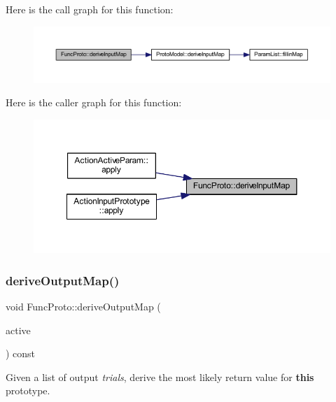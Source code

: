 Here is the call graph for this function\+:
\nopagebreak
\begin{figure}[H]
\begin{center}
\leavevmode
\includegraphics[width=350pt]{class_func_proto_a06ef0c088573715372df24ef978bd610_cgraph}
\end{center}
\end{figure}
Here is the caller graph for this function\+:
\nopagebreak
\begin{figure}[H]
\begin{center}
\leavevmode
\includegraphics[width=350pt]{class_func_proto_a06ef0c088573715372df24ef978bd610_icgraph}
\end{center}
\end{figure}
\mbox{\label{class_func_proto_a750224dcda509d76d01e3f45a3d38117}} 
\subsubsection{\texorpdfstring{deriveOutputMap()}{deriveOutputMap()}}
{\footnotesize\ttfamily void Func\+Proto\+::derive\+Output\+Map (\begin{DoxyParamCaption}\item[{\mbox{\hyperlink{class_param_active}{Param\+Active}} $\ast$}]{active }\end{DoxyParamCaption}) const\hspace{0.3cm}{\ttfamily [inline]}}



Given a list of output {\itshape trials}, derive the most likely return value for {\bfseries{this}} prototype. 

